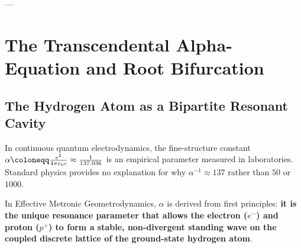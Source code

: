 \documentclass[
    12pt,
    a4paper,
    headings=normal,
    twoside=false,
    open=any,
    parskip=half
]{scrbook}
\let\hbar\relax
\begin{document}
---

\section{The Transcendental Alpha-Equation and Root Bifurcation}
\label{sec:ch5_transcendental_alpha}

\subsection{The Hydrogen Atom as a Bipartite Resonant Cavity}

In continuous quantum electrodynamics, the fine-structure constant $\alpha \coloneqq \frac{e^2}{4\pi\varepsilon_0 \hbar c} \approx \frac{1}{137.036}$ is an empirical parameter measured in laboratories. Standard physics provides no explanation for why $\alpha^{-1} \approx 137$ rather than $50$ or $1000$.

In Effective Metronic Geometrodynamics, $\alpha$ is derived from first principles: \textbf{it is the unique resonance parameter that allows the electron ($e^-$) and proton ($p^+$) to form a stable, non-divergent standing wave on the coupled discrete lattice of the ground-state hydrogen atom}.
\end{document}
